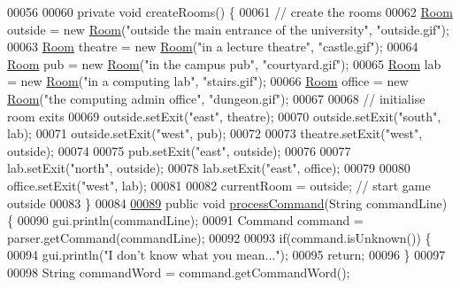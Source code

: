 \begin{DoxyCode}
00056 
00060     \textcolor{keyword}{private} \textcolor{keywordtype}{void} createRooms() \{
00061         \textcolor{comment}{// create the rooms}
00062         \hyperlink{classRoom}{Room} outside = \textcolor{keyword}{new} \hyperlink{classRoom}{Room}(\textcolor{stringliteral}{"outside the main entrance of the university"}, \textcolor{stringliteral}{"outside.gif"});
00063         \hyperlink{classRoom}{Room} theatre = \textcolor{keyword}{new} \hyperlink{classRoom}{Room}(\textcolor{stringliteral}{"in a lecture theatre"}, \textcolor{stringliteral}{"castle.gif"});
00064         \hyperlink{classRoom}{Room} pub = \textcolor{keyword}{new} \hyperlink{classRoom}{Room}(\textcolor{stringliteral}{"in the campus pub"}, \textcolor{stringliteral}{"courtyard.gif"});
00065         \hyperlink{classRoom}{Room} lab = \textcolor{keyword}{new} \hyperlink{classRoom}{Room}(\textcolor{stringliteral}{"in a computing lab"}, \textcolor{stringliteral}{"stairs.gif"});
00066         \hyperlink{classRoom}{Room} office = \textcolor{keyword}{new} \hyperlink{classRoom}{Room}(\textcolor{stringliteral}{"the computing admin office"}, \textcolor{stringliteral}{"dungeon.gif"});
00067 
00068         \textcolor{comment}{// initialise room exits}
00069         outside.setExit(\textcolor{stringliteral}{"east"}, theatre);
00070         outside.setExit(\textcolor{stringliteral}{"south"}, lab);
00071         outside.setExit(\textcolor{stringliteral}{"west"}, pub);
00072 
00073         theatre.setExit(\textcolor{stringliteral}{"west"}, outside);
00074 
00075         pub.setExit(\textcolor{stringliteral}{"east"}, outside);
00076 
00077         lab.setExit(\textcolor{stringliteral}{"north"}, outside);
00078         lab.setExit(\textcolor{stringliteral}{"east"}, office);
00079 
00080         office.setExit(\textcolor{stringliteral}{"west"}, lab);
00081 
00082         currentRoom = outside;  \textcolor{comment}{// start game outside}
00083     \}
00084 
\hypertarget{GameEngine_8java_source_l00089}{}\hyperlink{classGameEngine_ad7133885f313fa99bca3bb7cb8272f64}{00089}     \textcolor{keyword}{public} \textcolor{keywordtype}{void} \hyperlink{classGameEngine_ad7133885f313fa99bca3bb7cb8272f64}{processCommand}(String commandLine) \{
00090         gui.println(commandLine);
00091         Command command = parser.getCommand(commandLine);
00092 
00093         \textcolor{keywordflow}{if}(command.isUnknown()) \{
00094             gui.println(\textcolor{stringliteral}{"I don't know what you mean..."});
00095             \textcolor{keywordflow}{return};
00096         \}
00097 
00098         String commandWord = command.getCommandWord();

\end{DoxyCode}
